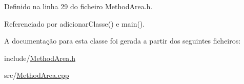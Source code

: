 Definido na linha 29 do ficheiro Method\+Area.\+h.



Referenciado por adicionar\+Classe() e main().



A documentação para esta classe foi gerada a partir dos seguintes ficheiros\+:\begin{DoxyCompactItemize}
\item 
include/\hyperlink{MethodArea_8h}{Method\+Area.\+h}\item 
src/\hyperlink{MethodArea_8cpp}{Method\+Area.\+cpp}\end{DoxyCompactItemize}
